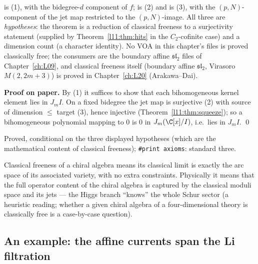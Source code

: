 \begin{dictionary}
 is (1), with  the
bidegree-$d$ component of $f$;  is (2) and  is (3), with  the
$(p,N)$-component of the jet map restricted to the $(p,N)$-image. All three are \emph{hypotheses}: the theorem is
a reduction of classical freeness to a surjectivity statement (supplied by Theorem~\ref{l11:thm:hits} in the
$C_2$-cofinite case) and a dimension count (a character identity). No VOA in this chapter's files is proved
classically free; the consumers are the boundary affine $\mathfrak{sl}_2$ files of Chapter~\ref{ch:L09}, and classical
freeness itself (boundary affine $\mathfrak{sl}_2$, Virasoro $M(2,2m+3)$) is proved in Chapter~\ref{ch:L20} (Arakawa--Dai).
\end{dictionary}

\textbf{Proof on paper.} By (1) it suffices to show that each bihomogeneous kernel element lies in $J_mI$. On a
fixed bidegree the jet map is surjective (2) with source of dimension $\le$ target (3), hence injective
(Theorem~\ref{l11:thm:squeeze}); so a bihomogeneous polynomial mapping to $0$ is $0$ in $J_m(\C[x]/I)$, i.e.\ lies in
$J_mI$. \qed

\begin{status}
Proved, conditional on the three displayed hypotheses (which are the mathematical content of classical freeness);
\texttt{\#print axioms}: standard three.
\end{status}

\begin{physics}
Classical freeness of a chiral algebra means its classical limit is exactly the arc space of its associated
variety, with no extra constraints. Physically it means that the full operator content of the chiral algebra is
captured by the classical moduli space and its jets --- the Higgs branch ``knows'' the whole Schur sector (a heuristic reading; whether a given chiral algebra of a
four-dimensional theory is classically free is a case-by-case question).
\end{physics}

\subsection{An example: the affine currents span the Li filtration}

